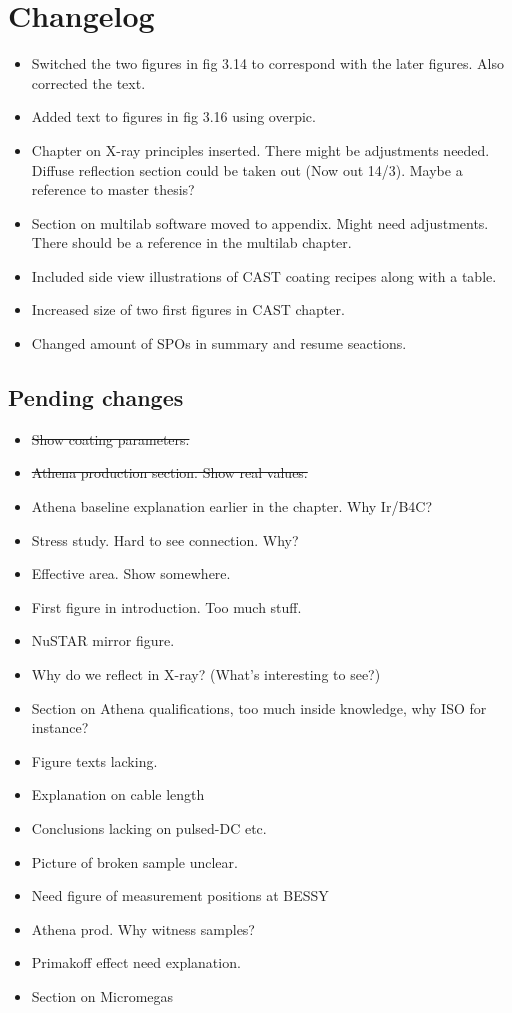 \chapter{Changelog}

\begin{itemize}
  \item Switched the two figures in fig 3.14 to correspond with the later figures. Also corrected the text.
  \item Added text to figures in fig 3.16 using overpic.
  \item Chapter on X-ray principles inserted. There might be adjustments needed. Diffuse reflection section could be taken out (Now out 14/3). Maybe a reference to master thesis?
  \item Section on multilab software moved to appendix. Might need adjustments. There should be a reference in the multilab chapter.
  \item Included side view illustrations of CAST coating recipes along with a table.
  \item Increased size of two first figures in CAST chapter.
  \item Changed amount of SPOs in summary and resume seactions.
\end{itemize}

\section{Pending changes}

\begin{itemize}
	\item \st{ Show coating parameters.}
	\item \st{ Athena production section. Show real values.}
	\item Athena baseline explanation earlier in the chapter. Why Ir/B4C?
	\item Stress study. Hard to see connection. Why?
	\item Effective area. Show somewhere.
	\item First figure in introduction. Too much stuff.
	\item NuSTAR mirror figure.
	\item Why do we reflect in X-ray? (What's interesting to see?)
	\item Section on Athena qualifications, too much inside knowledge, why ISO for instance?
	\item Figure texts lacking.
	\item Explanation on cable length
	\item Conclusions lacking on pulsed-DC etc.
	\item Picture of broken sample unclear.
	\item Need figure of measurement positions at BESSY
	\item Athena prod. Why witness samples?
	\item Primakoff effect need explanation.
	\item Section on Micromegas

\end{itemize}
